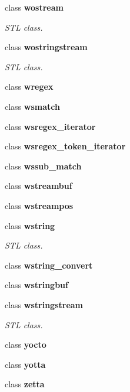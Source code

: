 \begin{DoxyCompactItemize}
class \textbf{ wostream}
\begin{DoxyCompactList}\small\item\em S\+TL class. \end{DoxyCompactList}\item 
class \textbf{ wostringstream}
\begin{DoxyCompactList}\small\item\em S\+TL class. \end{DoxyCompactList}\item 
class \textbf{ wregex}
\item 
class \textbf{ wsmatch}
\item 
class \textbf{ wsregex\+\_\+iterator}
\item 
class \textbf{ wsregex\+\_\+token\+\_\+iterator}
\item 
class \textbf{ wssub\+\_\+match}
\item 
class \textbf{ wstreambuf}
\item 
class \textbf{ wstreampos}
\item 
class \textbf{ wstring}
\begin{DoxyCompactList}\small\item\em S\+TL class. \end{DoxyCompactList}\item 
class \textbf{ wstring\+\_\+convert}
\item 
class \textbf{ wstringbuf}
\item 
class \textbf{ wstringstream}
\begin{DoxyCompactList}\small\item\em S\+TL class. \end{DoxyCompactList}\item 
class \textbf{ yocto}
\item 
class \textbf{ yotta}
\item 
class \textbf{ zetta}
\end{DoxyCompactItemize}
